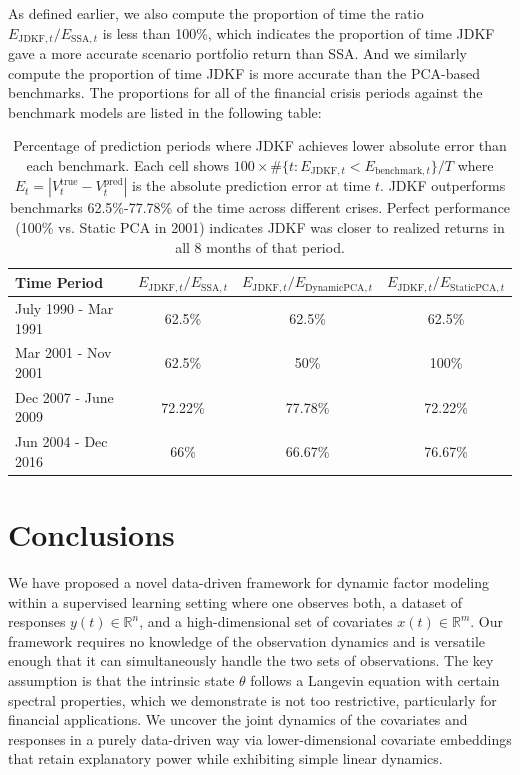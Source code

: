 \documentclass[11pt]{article}
\theoremstyle{plain}
\theoremstyle{definition}
\theoremstyle{remark}
\numberwithin{equation}{section}
\begin{document}
As defined earlier, we also compute the proportion of time the ratio $E_{\mathrm{JDKF},t}/E_{\mathrm{SSA},t}$ is less than 100\%, which indicates the proportion of time JDKF gave a more accurate scenario portfolio return than SSA. And we similarly compute the proportion of time JDKF is more accurate than the PCA-based benchmarks. The proportions for all of the financial crisis periods against the benchmark models are listed in the following table:
\begin{table}[H]
    \centering
    \begin{tabular}{lccc}
        \toprule
        \textbf{Time Period} & \textbf{$E_{\mathrm{JDKF},t}/E_{\mathrm{SSA},t}$} & \textbf{$E_{\mathrm{JDKF},t}/E_{\mathrm{Dynamic PCA},t}$} & \textbf{$E_{\mathrm{JDKF},t}/E_{\mathrm{Static PCA},t}$}\\
        \midrule
        July 1990 - Mar 1991 & 62.5\% & 62.5\% & 62.5\%\\
        Mar 2001 - Nov 2001 & 62.5\% & 50\% & 100\%\\
        Dec 2007 - June 2009 & 72.22\% & 77.78\% & 72.22\% \\
        Jun 2004 - Dec 2016 & 66\% & 66.67\% & 76.67\% \\
        \bottomrule
    \end{tabular}
\caption{Percentage of prediction periods where JDKF achieves lower absolute error 
than each benchmark. Each cell shows $100 \times \#\{t : E_{\text{JDKF},t} < E_{\text{benchmark},t}\}/T$ 
where $E_{t} = |V_t^{\text{true}} - V_t^{\text{pred}}|$ is the absolute prediction error 
at time $t$. JDKF outperforms benchmarks 62.5\%-77.78\% of the time across different 
crises. Perfect performance (100\% vs. Static PCA in 2001) indicates JDKF was closer to 
realized returns in all 8 months of that period.}
\label{tab:accuracy}
    \label{tab:accuracy}
\end{table}


\section{Conclusions}
\label{sec:conclusion}
We have proposed a novel data-driven framework for dynamic factor modeling within a supervised learning setting where one observes both, a dataset of responses $y(t) \in \mathbb{R}^n$, and a high-dimensional set of covariates $x(t) \in \mathbb{R}^m$. Our framework requires no knowledge of the observation dynamics and is versatile enough that it can simultaneously handle the two sets of observations. The key assumption is that the intrinsic state $\theta$ follows a Langevin equation with certain spectral properties, which we demonstrate is not too restrictive, particularly for financial applications. We uncover the joint dynamics of the covariates and responses in a purely data-driven way via lower-dimensional covariate embeddings that retain  explanatory power while exhibiting simple linear dynamics.
\end{document}
